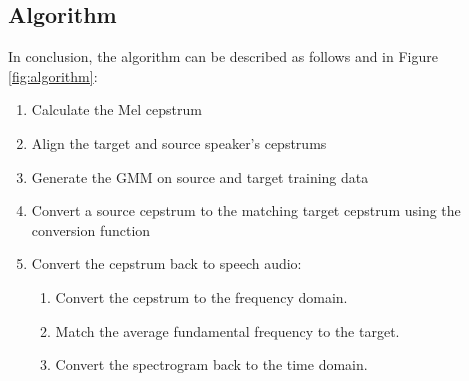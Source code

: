 \subsection{Algorithm}
In conclusion, the algorithm can be described as follows and in Figure \ref{fig:algorithm}:
\begin{enumerate}
\item Calculate the Mel cepstrum
\item Align the target and source speaker's cepstrums
\item Generate the GMM on source and target training data
\item Convert a source cepstrum to the matching target cepstrum using the conversion function
\item Convert the cepstrum back to speech audio:
\begin{enumerate}
\item Convert the cepstrum to the frequency domain.
\item Match the average fundamental frequency to the target.
\item Convert the spectrogram back to the time domain.
\end{enumerate}
\end{enumerate}
